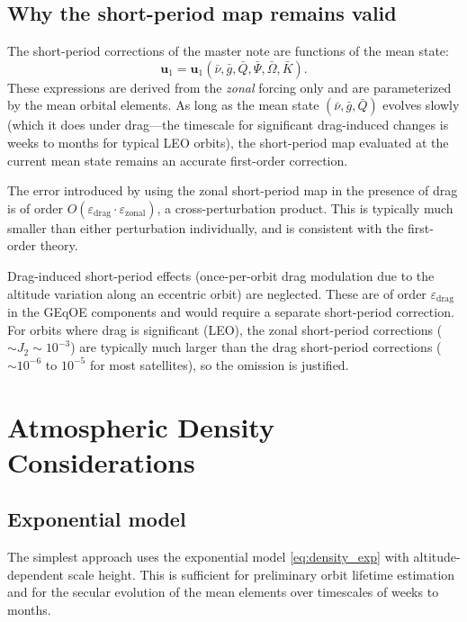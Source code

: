 \documentclass[11pt]{article}
\newcommand{\eps}{\varepsilon}
\begin{document}
\subsection{Why the short-period map remains valid}

The short-period corrections of the master note are functions of the
mean state:
\begin{equation}
\bm u_1 = \bm u_1(\bar\nu, \bar g, \bar Q, \bar\Psi, \bar\Omega, \bar K).
\end{equation}
These expressions are derived from the \emph{zonal} forcing only and are
parameterized by the mean orbital elements. As long as the mean state
$(\bar\nu, \bar g, \bar Q)$ evolves slowly (which it does under drag---the
timescale for significant drag-induced changes is weeks to months for
typical LEO orbits), the short-period map evaluated at the current mean
state remains an accurate first-order correction.

The error introduced by using the zonal short-period map in the presence of
drag is of order $O(\eps_{\mathrm{drag}} \cdot \eps_{\mathrm{zonal}})$, a
cross-perturbation product. This is typically much smaller than either
perturbation individually, and is consistent with the first-order theory.

Drag-induced short-period effects (once-per-orbit drag modulation due to
the altitude variation along an eccentric orbit) are neglected. These are of
order $\eps_{\mathrm{drag}}$ in the GEqOE components and would require a
separate short-period correction. For orbits where drag is significant
(LEO), the zonal short-period corrections ($\sim J_2 \sim 10^{-3}$) are
typically much larger than the drag short-period corrections ($\sim 10^{-6}$
to $10^{-5}$ for most satellites), so the omission is justified.


\section{Atmospheric Density Considerations}

\subsection{Exponential model}

The simplest approach uses the exponential model \eqref{eq:density_exp} with
altitude-dependent scale height. This is sufficient for preliminary orbit
lifetime estimation and for the secular evolution of the mean elements over
timescales of weeks to months.
\end{document}
